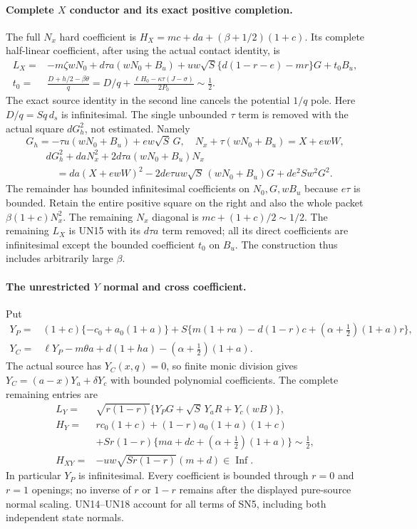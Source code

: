 \paragraph{Complete $X$ conductor and its exact positive completion.}
The full $N_x$ hard coefficient is
$H_X=mc+da+(\beta+1/2)(1+c)$. Its complete half-linear
coefficient, after using the actual contact identity, is
\[
\begin{split}
 L_X={}&-m\zeta wN_0+d\tau a(wN_0+B_u)
        +uw\sqrt S\{d(1-r-e)-mr\}G+t_0B_u,\\
 t_0={}&\frac{D+h/2-\beta\theta}{q}
       =D/q+\frac{\ell H_0-\kappa\tau(J-\sigma)}{2P_0}
          \sim\tfrac12.
\end{split}\tag{UN15}
\]
The exact source identity in the second line cancels the potential
$1/q$ pole. Here $D/q=S q\,d_s$ is infinitesimal. The single
unbounded $\tau$ term is removed with the actual square $dG_h^2$,
not estimated. Namely
\[
 G_h=-\tau u(wN_0+B_u)+ew\sqrt S\,G,\quad
 N_x+\tau(wN_0+B_u)=X+ewW,
\]
\[
\begin{split}
 &dG_h^2+daN_x^2+2d\tau a(wN_0+B_u)N_x\\
 &\quad=da(X+ewW)^2
       -2de\tau uw\sqrt S\,(wN_0+B_u)G+de^2Sw^2G^2.
\end{split}\tag{UN16}
\]
The remainder has bounded infinitesimal coefficients on $N_0,G,wB_u$
because $e\tau$ is bounded. Retain the entire positive square on the
right and also the whole packet $\beta(1+c)N_x^2$. The remaining
$N_x$ diagonal is $mc+(1+c)/2\sim1/2$. The remaining $L_X$ is
UN15 with its $d\tau a$ term removed; all its direct coefficients
are infinitesimal except the bounded coefficient $t_0$ on $B_u$.
The construction thus includes arbitrarily large $\beta$.

\paragraph{The unrestricted $Y$ normal and cross coefficient.}
Put
\[
\begin{split}
 Y_P={}&(1+c)\{-c_0+a_0(1+a)\}
 +S\{m(1+ra)-d(1-r)c+(\alpha+\tfrac12)(1+a)r\},\\
 Y_C={}&\ell Y_P-m\theta a+d(1+ha)-(\alpha+\tfrac12)(1+a).
\end{split}\tag{UN17}
\]
The actual source has $Y_C(x,q)=0$, so finite monic division gives
$Y_C=(a-x)Y_a+\delta Y_c$ with bounded polynomial coefficients.
The complete remaining entries are
\[
\begin{split}
 L_Y={}&\sqrt{r(1-r)}\{Y_PG+\sqrt S\,Y_aR+Y_c(wB)\},\\
 H_Y={}&rc_0(1+c)+(1-r)a_0(1+a)(1+c)\\
 &+Sr(1-r)\{ma+dc+(\alpha+\tfrac12)(1+a)\}\sim\tfrac12,\\
 H_{XY}={}&-uw\sqrt{Sr(1-r)}(m+d)\in\operatorname{Inf}.
\end{split}\tag{UN18}
\]
In particular $Y_P$ is infinitesimal. Every coefficient is bounded
through $r=0$ and $r=1$ openings; no inverse of $r$ or $1-r$ remains
after the displayed pure-source normal scaling. UN14--UN18 account
for all terms of SN5, including both independent state normals.

